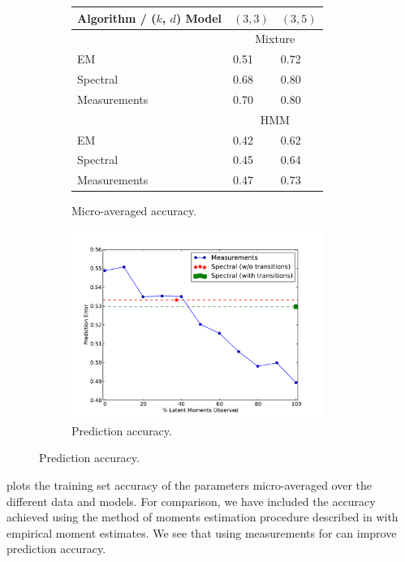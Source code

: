 \begin{figure}
  \centering
  \begin{subfigure}[b]{0.4\textwidth}
    \label{tab:errors}
    \begin{tabular}{l | l l }
        Algorithm / ($k$, $d$) Model & $(3,3)$ & $(3,5)$ \\ \hline
        & \multicolumn{2}{c}{Mixture} \\
        EM                    & 0.51 & 0.72 \\
        Spectral              & 0.68 & 0.80 \\
        Measurements  & 0.70 & 0.80 \\
        & \multicolumn{2}{c}{HMM} \\
        EM                    & 0.42 & 0.62  \\
        Spectral              & 0.45 & 0.64  \\
        Measurements  & 0.47 & 0.73
    \end{tabular}
    \caption{Micro-averaged accuracy.}
  \end{subfigure}
  \begin{subfigure}[b]{0.4\textwidth}
    \label{fig:measurements}
    \includegraphics[width=0.9\textwidth]{figures/measurements.pdf}
    \caption{Prediction accuracy.}
  \end{subfigure}
\end{figure}



 plots the training set accuracy of the parameters
micro-averaged over the different data and models.  For comparison, we have
included the accuracy achieved using the method of moments estimation procedure
described in  with empirical moment estimates.  We see
that using measurements for can improve prediction accuracy. 

